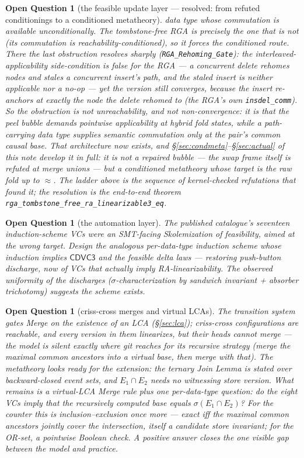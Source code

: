 \documentclass[11pt]{article}
\newtheorem{openq}[theorem]{Open Question}
\newcommand{\cd}{\mathsf{CDVC3}}
\newcommand{\lean}[1]{\texttt{#1}}
\newcommand{\eqobs}{\approx}
\begin{document}
\begin{openq}[the feasible update layer --- resolved: from refuted
conditionings to a conditioned metatheory]
data type whose commutation is available unconditionally. The
tombstone-free RGA is precisely the one that is not (its commutation is
reachability-conditioned), so it forces the conditioned route. There the
last obstruction resolves sharply (\lean{RGA\_Rehoming\_Gate}): the
interleaved-applicability side-condition is \emph{false} for the RGA --- a
concurrent delete rehomes nodes and stales a concurrent insert's path, and
the staled insert is neither applicable nor a no-op --- \emph{yet the
version still converges}, because the insert re-anchors at exactly the
node the delete rehomed to (the RGA's own \lean{insdel\_comm}). So the
obstruction is not unreachability, and not non-convergence: it is that the
peel bubble demands \emph{pointwise} applicability at hybrid fold states,
while a path-carrying data type supplies \emph{semantic} commutation only
at the pair's common causal base. That architecture now exists, and \S\ref{sec:condmeta}--\S\ref{sec:actual}
of this note develop it in full: it is not a repaired bubble --- the swap
frame itself is refuted at merge unions --- but a conditioned metatheory
whose target is the raw fold up to $\eqobs$. The ladder above is the
sequence of kernel-checked refutations that found it; the resolution is
the end-to-end theorem \lean{rga\_tombstone\_free\_ra\_linearizable3\_eq}.
\end{openq}

\begin{openq}[the automation layer]
The published catalogue's seventeen induction-scheme VCs were an
SMT-facing Skolemization of feasibility, aimed at the wrong target.
Design the analogous per-data-type induction scheme whose induction
implies $\cd$ and the feasible delta laws --- restoring push-button
discharge, now of VCs that actually imply RA-linearizability. The
observed uniformity of the discharges ($\sigma$-characterization by
sandwich invariant + absorber trichotomy) suggests the scheme exists.
\end{openq}

\begin{openq}[criss-cross merges and virtual LCAs]
\label{oq:crisscross}
The transition system gates Merge on the existence of an LCA
(\S\ref{sec:lca}); criss-cross configurations are reachable, and every
version in them linearizes, but their heads cannot merge --- the model
is silent exactly where git reaches for its \emph{recursive} strategy
(merge the maximal common ancestors into a virtual base, then merge with
that). The metatheory looks ready for the extension: the ternary Join
Lemma is stated over backward-closed \emph{event sets}, and
$E_1 \cap E_2$ needs no witnessing store version. What remains is a
virtual-LCA Merge rule plus one per-data-type question: do the eight VCs
imply that the recursively computed base equals
$\sigma(E_1 \cap E_2)$? For the counter this is inclusion--exclusion
once more --- exact iff the maximal common ancestors jointly cover the
intersection, itself a candidate store invariant; for the OR-set, a
pointwise Boolean check. A positive answer closes the one visible gap
between the model and practice.
\end{openq}
\end{document}
